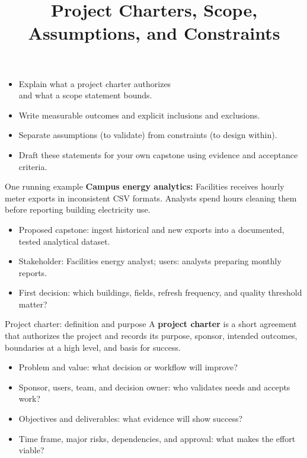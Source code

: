 \documentclass[aspectratio=43,12pt]{beamer}
\title{Project Charters, Scope,\\Assumptions, and Constraints}
\author{}
\date{
\color{aggiemaroon}{
DAEN 459 - Fall 2026\\
\textbf{Alexander Abuabara}
}}
\begin{document}
\begin{frame}
\titlepage
\end{frame}

\begin{frame}{}
\begin{itemize}
\item Explain what a project charter authorizes\\ \qquad \qquad and what a scope statement bounds.
\item Write measurable outcomes and explicit inclusions and exclusions.
\item Separate assumptions (to validate) from constraints (to design within).
\item Draft these statements for your own capstone using evidence and acceptance criteria.
\end{itemize}
\end{frame}

\begin{frame}{One running example}
\textbf{Campus energy analytics:} Facilities receives hourly meter exports in inconsistent CSV formats. Analysts spend hours cleaning them before reporting building electricity use.
\vspace{0.8em}
\begin{itemize}
\item Proposed capstone: ingest historical and new exports into a documented, tested analytical dataset.
\item Stakeholder: Facilities energy analyst; users: analysts preparing monthly reports.
\item First decision: which buildings, fields, refresh frequency, and quality threshold matter?
\end{itemize}
\end{frame}

\begin{frame}{Project charter: definition and purpose}
A \textbf{project charter} is a short agreement that authorizes the project and records its purpose, sponsor, intended outcomes, boundaries at a high level, and basis for success.
\vspace{0.7em}
\begin{itemize}
\item Problem and value: what decision or workflow will improve?
\item Sponsor, users, team, and decision owner: who validates needs and accepts work?
\item Objectives and deliverables: what evidence will show success?
\item Time frame, major risks, dependencies, and approval: what makes the effort viable?
\end{itemize}
\end{frame}
\end{document}
